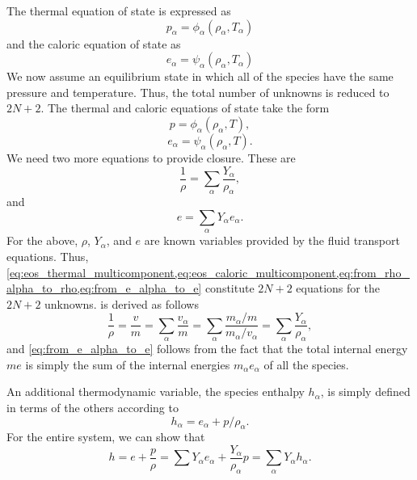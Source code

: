 \documentclass[oneside,a4paper,11pt]{report}
\begin{document}
The thermal equation of state is expressed as
\begin{equation}
    p_\alpha = \phi_\alpha (\rho_\alpha, T_\alpha)
\end{equation}
and the caloric equation of state as
\begin{equation}
    e_\alpha = \psi_\alpha (\rho_\alpha, T_\alpha)
\end{equation}
We now assume an equilibrium state in which all of the species have the same pressure and temperature. Thus, the total number of unknowns is reduced to $2N+2$. The thermal and caloric equations of state take the form
\begin{equation}
\label{eq:eos_thermal_multicomponent}
    p = \phi_\alpha (\rho_\alpha, T),
\end{equation}
\begin{equation}
\label{eq:eos_caloric_multicomponent}
    e_\alpha = \psi_\alpha (\rho_\alpha, T).
\end{equation}
We need two more equations to provide closure. These are
\begin{equation}
\label{eq:from_rho_alpha_to_rho}
   \frac{1}{\rho} = \sum_\alpha \frac{Y_\alpha}{\rho_\alpha},
\end{equation}
and
\begin{equation}
\label{eq:from_e_alpha_to_e}
    e = \sum_\alpha Y_\alpha e_\alpha.
\end{equation}
For the above, $\rho$, $Y_\alpha$, and $e$ are known variables provided by the fluid transport equations. Thus, \cref{eq:eos_thermal_multicomponent,eq:eos_caloric_multicomponent,eq:from_rho_alpha_to_rho,eq:from_e_alpha_to_e} constitute $2N+2$ equations for the $2N+2$ unknowns.  is derived as follows
\begin{equation}
    \frac{1}{\rho} = \frac{v}{m} = \sum_\alpha \frac{v_\alpha}{m} = \sum_\alpha \frac{m_\alpha / m}{m_\alpha / v_\alpha} = \sum_\alpha \frac{Y_\alpha}{\rho_\alpha},
\end{equation}
and \cref{eq:from_e_alpha_to_e} follows from the fact that the total internal energy $m e$ is simply the sum of the internal energies $m_\alpha e_\alpha$ of all the species. 

An additional thermodynamic variable, the species enthalpy $h_\alpha$, is simply defined in terms of the others according to 
\begin{equation}
\label{eq:species_enthalpy}
    h_\alpha = e_\alpha + p / \rho_\alpha.
\end{equation}
For the entire system, we can show that
\begin{equation}
\label{eq:from_h_alpha_to_h}
     h = e + \frac{p}{\rho} = \sum Y_\alpha e_\alpha + \frac{Y_\alpha}{\rho_\alpha} p = \sum_\alpha Y_\alpha h_\alpha.
\end{equation}
\end{document}
